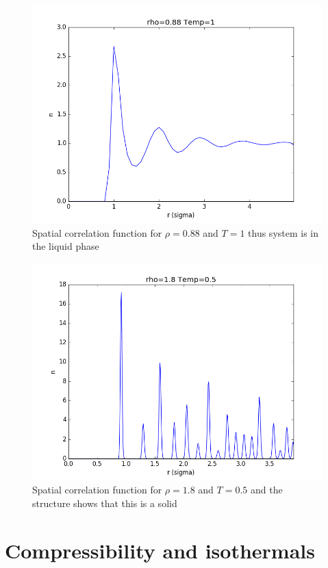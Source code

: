 \documentclass[12pt,a4paper]{report}
\begin{document}
\begin{figure}[H]
\centering
\includegraphics[scale=0.5]{Correlation_rho088_T1_rm35_2.png}
\caption{Spatial correlation function for $\rho=0.88$ and $T=1$ thus system is in the liquid phase}
\label{fig:liq_cor}
\end{figure}

\begin{figure}[H]
\centering
\includegraphics[scale=0.5]{Correlation_rho18_T05_rm35_2.png}
\caption{Spatial correlation function for $\rho=1.8$ and $T=0.5$ and the structure shows that this is a solid}
\label{fig:solid_cor}
\end{figure}

\section{Compressibility and isothermals}
\end{document}
